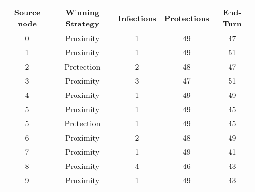\documentclass[results.tex]{subfiles}
\begin{document}
    \begin{center}
        \begin{tabular}{| c || c | c | c | c |}
            \hline
            {\bfseries Source node} & {\bfseries Winning Strategy} & {\bfseries Infections} & {\bfseries Protections}
            & {\bfseries End-Turn}
            \\  %
            \hline\hline
            0                       & Proximity                    & 1                      & 49                      & 47                   \\
            \hline
            1                       & Proximity                    & 1                      & 49                      & 51                   \\
            \hline
            2                       & Protection                   & 2                      & 48                      & 47                   \\
            \hline
            3                       & Proximity                    & 3                      & 47                      & 51                   \\
            \hline
            4                       & Proximity                    & 1                      & 49                      & 49                   \\
            \hline
            5                       & Proximity                    & 1                      & 49                      & 45                   \\
            \hline
            5                       & Protection                   & 1                      & 49                      & 45                   \\
            \hline
            6                       & Proximity                    & 2                      & 48                      & 49                   \\
            \hline
            7                       & Proximity                    & 1                      & 49                      & 41                   \\
            \hline
            8                       & Proximity                    & 4                      & 46                      & 43                   \\
            \hline
            9                       & Proximity                    & 1                      & 49                      & 43                   \\

\end{tabular}
\end{center}
\end{document}
